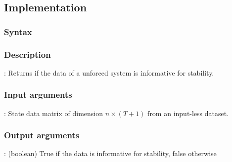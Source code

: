 

\subsection{Implementation}
\subsubsection*{Syntax}

\subsubsection*{Description}
: Returns if the data of a unforced system is informative for stability.

\subsubsection*{Input arguments}
\textbf{}: State data matrix of dimension $n \times (T+1)$ from an input-less dataset.

\subsubsection*{Output arguments}
\textbf{}: (boolean) True if the data is informative for stability, false otherwise

